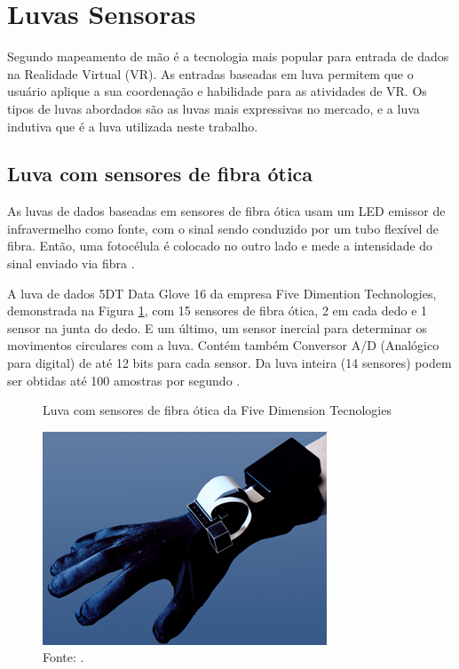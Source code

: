 
\section{Luvas Sensoras}
Segundo  mapeamento de mão é a tecnologia  mais popular para entrada de dados na Realidade Virtual  (VR). As entradas baseadas em luva permitem que o usuário aplique a sua coordenação e habilidade para as atividades de VR. Os tipos de luvas abordados são as luvas mais expressivas no mercado, e a luva indutiva que é a luva utilizada neste trabalho.


\subsection{Luva com sensores de fibra ótica}
As luvas de dados baseadas em sensores de fibra ótica usam um LED emissor de infravermelho como fonte, com o sinal sendo 
conduzido por um tubo flexível de fibra. Então, uma fotocélula é colocado no outro lado e mede a intensidade do sinal enviado via 
fibra \cite{baseadoruani}.
		
A luva de dados 5DT Data Glove 16 da empresa Five Dimention Technologies, demonstrada na Figura \ref{fig:5DT}, com 15 sensores de fibra ótica, 2 em cada dedo e 
1 sensor na junta do dedo. E um último, um sensor inercial para determinar os movimentos circulares com a luva. Contém também 
Conversor A/D (Analógico para digital) de até 12 bits para cada sensor. Da luva inteira (14 sensores) podem ser obtidas até 100 
amostras por segundo \cite{FiveD}.

\begin{figure}[H]
	\vspace{4mm}
    \centering
    \caption{Luva com sensores de fibra ótica da Five Dimension Tecnologies}
    \label{fig:5DT}
    \includegraphics[scale=0.6]{imagens/5DT_Glove.jpeg}    
    \caption*{Fonte: .}
\end{figure}
	

